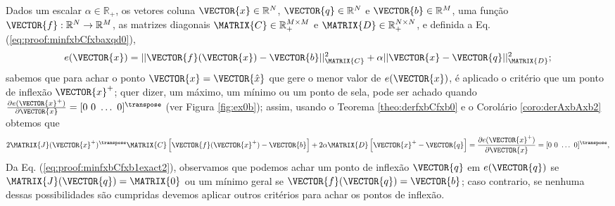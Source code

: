 \begin{myproofT}\label{proof:theo:minfxbCfxbaxqd}
Dados
um escalar $\alpha\in \mathbb{R}_+$,
os vetores coluna $\VECTOR{x}\in \mathbb{R}^N$, 
$\VECTOR{q}\in \mathbb{R}^N$ e
$\VECTOR{b}\in \mathbb{R}^M$,  
uma função $\VECTOR{f}:\mathbb{R}^{N} \rightarrow \mathbb{R}^{M}$, 
as matrizes diagonais $\MATRIX{C} \in \mathbb{R}^{M\times M}_+$ e $\MATRIX{D} \in \mathbb{R}^{N\times N}_+$, e 
definida a Eq. (\ref{eq:proof:minfxbCfxbaxqd0}),
\begin{equation}\label{eq:proof:minfxbCfxbaxqd0}
e(\VECTOR{x})=||\VECTOR{f}(\VECTOR{x})-\VECTOR{b}||_{\MATRIX{C}}^2+\alpha||\VECTOR{x}-\VECTOR{q}||_{\MATRIX{D}}^2;
\end{equation}
sabemos que para achar o ponto $\VECTOR{x}=\VECTOR{\hat{x}}$ que gere o menor valor de $e(\VECTOR{x})$, é aplicado
o critério que um ponto de inflexão $\VECTOR{x}^+$; 
quer dizer, um máximo, um mínimo ou um ponto de sela, pode ser achado quando 
$\frac{\partial e(\VECTOR{x}^+)}{\partial \VECTOR{x} }=[0~ 0~ \hdots~ 0 ]^{\transpose}$ (ver Figura \ref{fig:ex0b});
assim, usando o Teorema \ref{theo:derfxbCfxb0} e o Corolário \ref{coro:derAxbAxb2} obtemos que
\begin{equation}\label{eq:proof:minfxbCfxb1exact2}
2 \MATRIX{J}(\VECTOR{x}^+)^{\transpose}\MATRIX{C}\left[ \VECTOR{f}(\VECTOR{x}^+)-\VECTOR{b} \right] +
2 \alpha\MATRIX{D}\left[\VECTOR{x}^+-\VECTOR{q}\right]
=
\frac{\partial e(\VECTOR{x}^+)}{\partial \VECTOR{x} }=[0~ 0~ \hdots~ 0 ]^{\transpose},
\end{equation}
Da Eq. (\ref{eq:proof:minfxbCfxb1exact2}), observamos 
que podemos achar um ponto de inflexão $\VECTOR{q}$
em $e(\VECTOR{q})$ se 
$\MATRIX{J}(\VECTOR{q})  = \MATRIX{0}$ ou um mínimo geral se $\VECTOR{f}(\VECTOR{q})=\VECTOR{b}$;
caso contrario, 
se nenhuma dessas possibilidades são cumpridas devemos aplicar outros critérios para achar os pontos de inflexão.


\end{myproofT}
